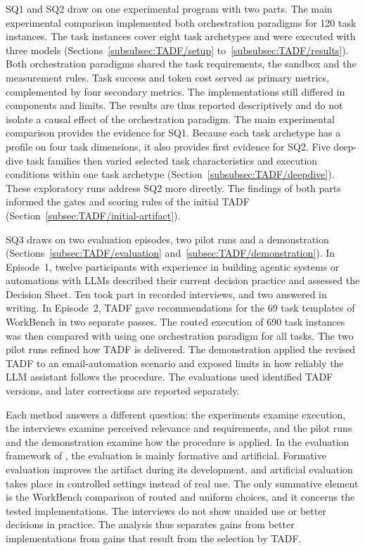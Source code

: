 SQ1 and SQ2 draw on one experimental program with two parts. The main experimental comparison implemented both orchestration paradigms for 120 task instances. The task instances cover eight task archetypes and were executed with three models (Sections~\ref{subsubsec:TADF/setup} to~\ref{subsubsec:TADF/results}). Both orchestration paradigms shared the task requirements, the sandbox and the measurement rules. Task success and token cost served as primary metrics, complemented by four secondary metrics. The implementations still differed in components and limits. The results are thus reported descriptively and do not isolate a causal effect of the orchestration paradigm. The main experimental comparison provides the evidence for SQ1. Because each task archetype has a profile on four task dimensions, it also provides first evidence for SQ2. Five deep-dive task families then varied selected task characteristics and execution conditions within one task archetype (Section~\ref{subsubsec:TADF/deepdive}). These exploratory runs address SQ2 more directly. The findings of both parts informed the gates and scoring rules of the initial TADF (Section~\ref{subsec:TADF/initial-artifact}).
 
SQ3 draws on two evaluation episodes, two pilot runs and a demonstration (Sections~\ref{subsec:TADF/evaluation} and~\ref{subsec:TADF/demonstration}). In Episode~1, twelve participants with experience in building agentic systems or automations with LLMs described their current decision practice and assessed the Decision Sheet. Ten took part in recorded interviews, and two answered in writing. In Episode~2, TADF gave recommendations for the 69 task templates of WorkBench in two separate passes. The routed execution of 690 task instances was then compared with using one orchestration paradigm for all tasks. The two pilot runs refined how TADF is delivered. The demonstration applied the revised TADF to an email-automation scenario and exposed limits in how reliably the LLM assistant follows the procedure. The evaluations used identified TADF versions, and later corrections are reported separately.
 
Each method answers a different question: the experiments examine execution, the interviews examine perceived relevance and requirements, and the pilot runs and the demonstration examine how the procedure is applied. In the evaluation framework of \textcite{venableFEDSFrameworkEvaluation2016}, the evaluation is mainly formative and artificial. Formative evaluation improves the artifact during its development, and artificial evaluation takes place in controlled settings instead of real use. The only summative element is the WorkBench comparison of routed and uniform choices, and it concerns the tested implementations. The interviews do not show unaided use or better decisions in practice. The analysis thus separates gains from better implementations from gains that result from the selection by TADF.
 

